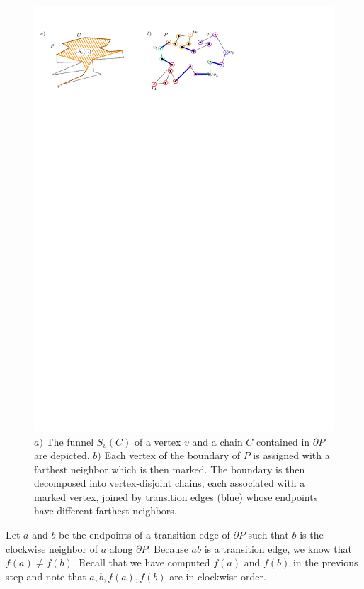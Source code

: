 \documentclass[a4paper,UKenglish]{lipics}
\newcommand{\fn}[2]{\ensuremath{S_{\scriptscriptstyle #1}(#2)}}
\newcommand{\ff}[1]{\ensuremath{f(#1)}}
\begin{document}
\begin{figure}[tb]
\centering
\includegraphics{img/MarkedVertices.pdf}

\caption{\small 
$a)$ The funnel $\fn{v}{C}$ of a vertex $v$ and a chain $C$ contained in $\partial P$ are depicted.
$b)$ Each vertex of the boundary of $P$ is assigned with a farthest neighbor which is then marked. 
The boundary is then decomposed into vertex-disjoint chains, each associated with a marked vertex, joined by transition edges (blue) whose endpoints have different farthest neighbors.}
\label{fig:Marked vertices decomposition}
\end{figure}

Let $a$ and $b$ be the endpoints of a transition edge of $\partial P$ such that 
$b$ is the clockwise neighbor of $a$ along $\partial P$. Because $ab$ is a transition edge, we know that $\ff{a}\neq \ff{b}$.
Recall that we have computed $\ff{a}$ and $\ff{b}$ in the previous step and note that $a,b, \ff{a}, \ff{b}$ are in clockwise order. 
 
\end{document}
